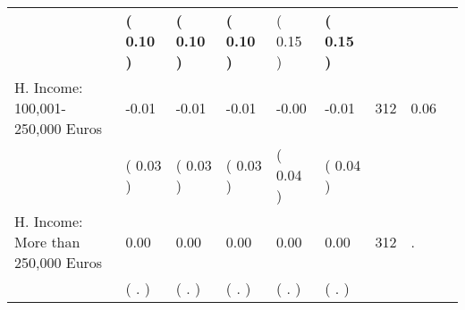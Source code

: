 \begin{tabular}{L{6.2cm} C{1.8cm} C{1.8cm} C{1.8cm} C{1.8cm} C{1.8cm} C{1.8cm} C{0.3cm} C{0.3cm}}
 & \textbf{(     0.10 )} & \textbf{(     0.10 )} & \textbf{(     0.10 )} & (     0.15 ) & \textbf{(     0.15 )}  & \\
H. Income: 100,001-250,000 Euros &     -0.01 &     -0.01 &     -0.01 &     -0.00 &     -0.01  & 312 &       0.06 \\ 
 & (     0.03 ) & (     0.03 ) & (     0.03 ) & (     0.04 ) & (     0.04 )  & \\
H. Income: More than 250,000 Euros &      0.00 &      0.00 &      0.00 &      0.00 &      0.00  & 312 &          . \\ 
 & (        . ) & (        . ) & (        . ) & (        . ) & (        . )  & \\
\bottomrule
\end{tabular}
